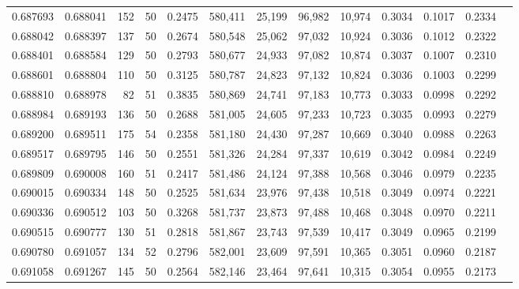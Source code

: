 \begin{tabular}{rrrrrrrrrrrrr}
0.687693 & 0.688041 &   152 &  50 &                                     0.2475 & 580,411 &  25,199 &  96,982 &  10,974 & 0.3034 & 0.1017 & 0.2334 \\
0.688042 & 0.688397 &   137 &  50 &                                     0.2674 & 580,548 &  25,062 &  97,032 &  10,924 & 0.3036 & 0.1012 & 0.2322 \\
0.688401 & 0.688584 &   129 &  50 &                                     0.2793 & 580,677 &  24,933 &  97,082 &  10,874 & 0.3037 & 0.1007 & 0.2310 \\
0.688601 & 0.688804 &   110 &  50 &                                     0.3125 & 580,787 &  24,823 &  97,132 &  10,824 & 0.3036 & 0.1003 & 0.2299 \\
0.688810 & 0.688978 &    82 &  51 &                                     0.3835 & 580,869 &  24,741 &  97,183 &  10,773 & 0.3033 & 0.0998 & 0.2292 \\
0.688984 & 0.689193 &   136 &  50 &                                     0.2688 & 581,005 &  24,605 &  97,233 &  10,723 & 0.3035 & 0.0993 & 0.2279 \\
0.689200 & 0.689511 &   175 &  54 &                                     0.2358 & 581,180 &  24,430 &  97,287 &  10,669 & 0.3040 & 0.0988 & 0.2263 \\
0.689517 & 0.689795 &   146 &  50 &                                     0.2551 & 581,326 &  24,284 &  97,337 &  10,619 & 0.3042 & 0.0984 & 0.2249 \\
0.689809 & 0.690008 &   160 &  51 &                                     0.2417 & 581,486 &  24,124 &  97,388 &  10,568 & 0.3046 & 0.0979 & 0.2235 \\
0.690015 & 0.690334 &   148 &  50 &                                     0.2525 & 581,634 &  23,976 &  97,438 &  10,518 & 0.3049 & 0.0974 & 0.2221 \\
0.690336 & 0.690512 &   103 &  50 &                                     0.3268 & 581,737 &  23,873 &  97,488 &  10,468 & 0.3048 & 0.0970 & 0.2211 \\
0.690515 & 0.690777 &   130 &  51 &                                     0.2818 & 581,867 &  23,743 &  97,539 &  10,417 & 0.3049 & 0.0965 & 0.2199 \\
0.690780 & 0.691057 &   134 &  52 &                                     0.2796 & 582,001 &  23,609 &  97,591 &  10,365 & 0.3051 & 0.0960 & 0.2187 \\
0.691058 & 0.691267 &   145 &  50 &                                     0.2564 & 582,146 &  23,464 &  97,641 &  10,315 & 0.3054 & 0.0955 & 0.2173 \\

\end{tabular}
